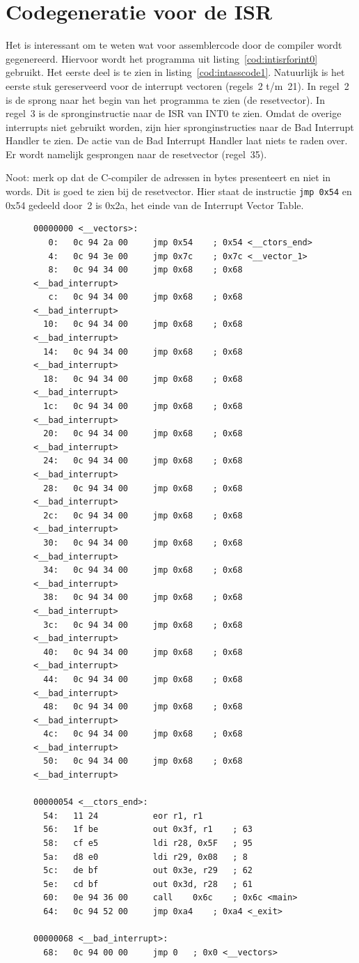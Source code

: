 \section{Codegeneratie voor de ISR}
Het is interessant om te weten wat voor assemblercode door de compiler wordt
gegenereerd. Hiervoor wordt het programma uit listing~\ref{cod:intisrforint0}
gebruikt. Het eerste deel is te zien in listing~\ref{cod:intasscode1}.
Natuurlijk is het eerste stuk gereserveerd voor de interrupt vectoren
(regels~2 t/m~21). In regel~2 is de sprong naar het begin van het programma
te zien (de resetvector). In regel~3 is de spronginstructie naar de ISR van 
INT0 te zien.
Omdat de overige interrupts niet gebruikt worden, zijn hier spronginstructies
naar de Bad Interrupt Handler te zien. De actie van de Bad Interrupt Handler
laat niets te raden over. Er wordt namelijk gesprongen naar de resetvector
(regel~35).

Noot: merk op dat de C-compiler de adressen in bytes presenteert en niet in
words. Dit is goed te zien bij de resetvector. Hier staat de instructie
\lstinline|jmp 0x54| en 0x54 gedeeld door~2 is 0x2a, het einde van de
Interrupt Vector Table.

\begin{figure}[!ht]
\begin{lstlisting}[language=AVRassembler,caption=De interrupt vector table en opstartcode.,label=cod:intasscode1]
00000000 <__vectors>:
   0:	0c 94 2a 00 	jmp	0x54	; 0x54 <__ctors_end>
   4:	0c 94 3e 00 	jmp	0x7c	; 0x7c <__vector_1>
   8:	0c 94 34 00 	jmp	0x68	; 0x68 <__bad_interrupt>
   c:	0c 94 34 00 	jmp	0x68	; 0x68 <__bad_interrupt>
  10:	0c 94 34 00 	jmp	0x68	; 0x68 <__bad_interrupt>
  14:	0c 94 34 00 	jmp	0x68	; 0x68 <__bad_interrupt>
  18:	0c 94 34 00 	jmp	0x68	; 0x68 <__bad_interrupt>
  1c:	0c 94 34 00 	jmp	0x68	; 0x68 <__bad_interrupt>
  20:	0c 94 34 00 	jmp	0x68	; 0x68 <__bad_interrupt>
  24:	0c 94 34 00 	jmp	0x68	; 0x68 <__bad_interrupt>
  28:	0c 94 34 00 	jmp	0x68	; 0x68 <__bad_interrupt>
  2c:	0c 94 34 00 	jmp	0x68	; 0x68 <__bad_interrupt>
  30:	0c 94 34 00 	jmp	0x68	; 0x68 <__bad_interrupt>
  34:	0c 94 34 00 	jmp	0x68	; 0x68 <__bad_interrupt>
  38:	0c 94 34 00 	jmp	0x68	; 0x68 <__bad_interrupt>
  3c:	0c 94 34 00 	jmp	0x68	; 0x68 <__bad_interrupt>
  40:	0c 94 34 00 	jmp	0x68	; 0x68 <__bad_interrupt>
  44:	0c 94 34 00 	jmp	0x68	; 0x68 <__bad_interrupt>
  48:	0c 94 34 00 	jmp	0x68	; 0x68 <__bad_interrupt>
  4c:	0c 94 34 00 	jmp	0x68	; 0x68 <__bad_interrupt>
  50:	0c 94 34 00 	jmp	0x68	; 0x68 <__bad_interrupt>

00000054 <__ctors_end>:
  54:	11 24       	eor	r1, r1
  56:	1f be       	out	0x3f, r1	; 63
  58:	cf e5       	ldi	r28, 0x5F	; 95
  5a:	d8 e0       	ldi	r29, 0x08	; 8
  5c:	de bf       	out	0x3e, r29	; 62
  5e:	cd bf       	out	0x3d, r28	; 61
  60:	0e 94 36 00 	call	0x6c	; 0x6c <main>
  64:	0c 94 52 00 	jmp	0xa4	; 0xa4 <_exit>

00000068 <__bad_interrupt>:
  68:	0c 94 00 00 	jmp	0	; 0x0 <__vectors>
\end{lstlisting}
\end{figure}

